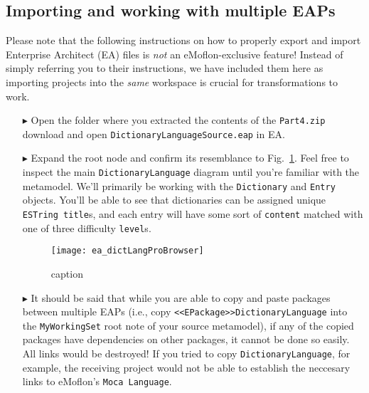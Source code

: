 \newpage
\hypertarget{multiEAP}{}
\subsection{Importing and working with multiple EAPs}
\visHeader

Please note that the following instructions on how to properly export and import Enterprise Architect (EA) files is \emph{not} an eMoflon-exclusive feature!
Instead of simply referring you to their instructions, we have included them here as importing projects into the \emph{same} workspace is crucial for
transformations to work.

\begin{itemize}

\item[$\blacktriangleright$] Open the folder where you extracted the contents of the \texttt{Part4.zip} download and open \texttt{DictionaryLanguageSource.eap}
in EA.

\vspace{0.5cm}

\item[$\blacktriangleright$] Expand the root node and confirm its resemblance to Fig.~\ref{fig:dictionaryLangStart}. Feel free to inspect the main
\texttt{DictionaryLanguage} diagram until you're familiar with the metamodel. We'll primarily be working with the \texttt{Dictionary} and
\texttt{Entry} objects. You'll be able to see that dictionaries can be assigned unique \texttt{ESTring title}s, and each entry will have some sort of
\texttt{content} matched with one of three difficulty \texttt{level}s.

\vspace{0.5cm}

\begin{figure}[htbp]
\begin{center}
  \texttt{[image: ea\_dictLangProBrowser]}
  \caption{caption}
  \label{fig:dictionaryLangStart}
\end{center}
\end{figure}

\item[$\blacktriangleright$] It should be said that while you are able to copy and paste packages between multiple EAPs (i.e., copy
\texttt{<<EPack\-age>>DictionaryLanguage} into the \texttt{MyWorkingSet} root note of your source metamodel), if any of the copied packages have dependencies on
other packages, it cannot be done so easily. All links would be destroyed! If you tried to copy \texttt{DictionaryLanguage}, for example, the receiving project
would not be able to establish the neccesary links to eMoflon's \texttt{Moca Language}.


\end{itemize}
